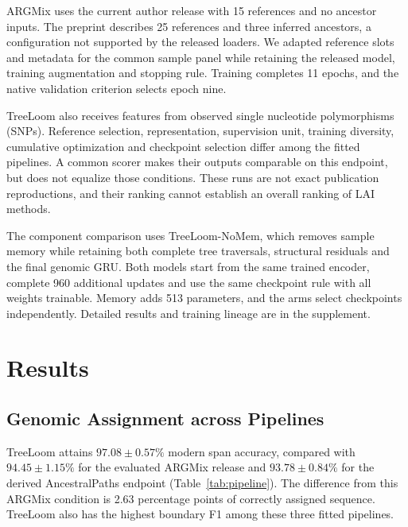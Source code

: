 \documentclass[letterpaper]{article}
\begin{document}
ARGMix uses the current author release with 15 references and no ancestor inputs. The preprint describes 25 references and three inferred ancestors, a configuration not supported by the released loaders. We adapted reference slots and metadata for the common sample panel while retaining the released model, training augmentation and stopping rule. Training completes 11 epochs, and the native validation criterion selects epoch nine.

TreeLoom also receives features from observed single nucleotide polymorphisms (SNPs). Reference selection, representation, supervision unit, training diversity, cumulative optimization and checkpoint selection differ among the fitted pipelines. A common scorer makes their outputs comparable on this endpoint, but does not equalize those conditions. These runs are not exact publication reproductions, and their ranking cannot establish an overall ranking of LAI methods.

The component comparison uses TreeLoom-NoMem, which removes sample memory while retaining both complete tree traversals, structural residuals and the final genomic GRU. Both models start from the same trained encoder, complete 960 additional updates and use the same checkpoint rule with all weights trainable. Memory adds 513 parameters, and the arms select checkpoints independently. Detailed results and training lineage are in the supplement.

\section{Results}
\subsection{Genomic Assignment across Pipelines}
TreeLoom attains $97.08\pm0.57\%$ modern span accuracy, compared with $94.45\pm1.15\%$ for the evaluated ARGMix release and $93.78\pm0.84\%$ for the derived AncestralPaths endpoint (Table~\ref{tab:pipeline}). The difference from this ARGMix condition is 2.63 percentage points of correctly assigned sequence. TreeLoom also has the highest boundary F1 among these three fitted pipelines.
\end{document}
